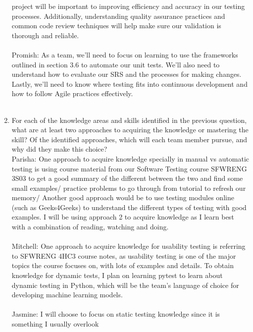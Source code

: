 \documentclass[12pt, titlepage]{article}
\begin{document}
\begin{enumerate}
  project will be important to improving efficiency and accuracy in our testing processes. Additionally, understanding 
  quality assurance practices and common code review techniques will help make sure our validation is thorough and reliable. \\\\
  \hspace{2em} Promish: As a team, we’ll need to focus on learning to use the frameworks outlined 
  in section 3.6 to automate our unit tests. We’ll also need to understand how to evaluate our 
  SRS and the processes for making changes. Lastly, we’ll need to know where testing fits 
  into continuous development and how to follow Agile practices effectively.\\\\
  \item For each of the knowledge areas and skills identified in the previous
  question, what are at least two approaches to acquiring the knowledge or
  mastering the skill?  Of the identified approaches, which will each team
  member pursue, and why did they make this choice?\\
  \newline
  \hspace{2em} Parisha: One approach to acquire knowledge specially in manual vs automatic testing is using course material from our Software Testing course SFWRENG 3S03
  to get a good summary of the different between the two and find some small examples/ practice problems to go through from tutorial to refresh our memory/ 
  Another good approach would be to use testing modules online (such as Geeks4Geeks) to understand the different types of testing with good examples.
  I will be using approach 2 to acquire knowledge as I learn best with a combination of reading, watching and doing. \\\\
  \hspace{2em} Mitchell: One approach to acquire knowledge for usability testing is referring to SFWRENG 4HC3 course notes,
  as usability testing is one of the major topics the course focuses on, with lots of examples and details. To obtain knowledge for dynamic tests, I plan on learning pytest to learn about dynamic testing in Python, which will be the
  team's language of choice for developing machine learning models.\\\\
  \hspace{2em} Jasmine: I will choose to focus on static testing knowledge since it is something I usually overlook 

\end{enumerate}
\end{document}

